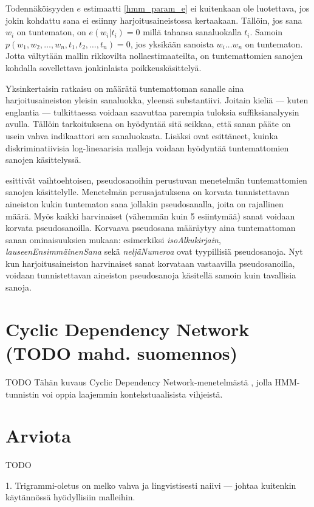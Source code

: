 \documentclass[utf8,bachelor,manualbib]{gradu3}
\begin{document}
Todennäköisyyden $e$ estimaatti \eqref{hmm_param_e} ei kuitenkaan ole luotettava, jos jokin kohdattu sana ei esiinny harjoitusaineistossa kertaakaan. Tällöin, jos sana $w_i$ on tuntematon, on $e(w_i|t_i)=0$ millä tahansa sanaluokalla $t_i$. Samoin $p(w_1, w_2, \ldots, w_n, t_1, t_2, \ldots, t_n) = 0$, jos yksikään sanoista $w_i \ldots w_n$ on tuntematon. Jotta vältytään mallin rikkovilta nollaestimaateilta, on tuntemattomien sanojen kohdalla sovellettava jonkinlaista poikkeuskäsittelyä.

Yksinkertaisin ratkaisu on määrätä tuntemattoman sanalle aina harjoitusaineiston yleisin sanaluokka, yleensä substantiivi. Joitain kieliä --- kuten englantia --- tulkittaessa voidaan saavuttaa parempia tuloksia suffiksianalyysin \citep{samuelsson1993} avulla. Tällöin tarkoituksena on hyödyntää sitä seikkaa, että sanan pääte on usein vahva indikaattori sen sanaluokasta. Lisäksi \citet{toutanova2003} ovat esittäneet, kuinka diskriminatiivisia log-lineaarisia malleja voidaan hyödyntää tuntemattomien sanojen käsittelyssä.

\citet{bikel1999} esittivät vaihtoehtoisen, pseudosanoihin perustuvan menetelmän tuntemattomien sanojen käsittelylle. Menetelmän perusajatuksena on korvata tunnistettavan aineiston kukin tuntematon sana jollakin pseudosanalla, joita on rajallinen määrä. Myös kaikki harvinaiset (vähemmän kuin 5 esiintymää) sanat voidaan korvata pseudosanoilla. Korvaava pseudosana määräytyy aina tuntemattoman sanan ominaisuuksien mukaan: esimerkiksi \textit{isoAlkukirjain}, \textit{lauseenEnsimmäinenSana} sekä \textit{neljäNumeroa} ovat tyypillisiä pseudosanoja. Nyt kun harjoitusaineiston harvinaiset sanat korvataan vastaavilla pseudosanoilla, voidaan tunnistettavan aineiston pseudosanoja käsitellä samoin kuin tavallisia sanoja.


\section{Cyclic Dependency Network (TODO mahd. suomennos)}

TODO Tähän kuvaus Cyclic Dependency Network-menetelmästä \citep{heckerman2000, toutanova2003}, jolla HMM-tunnistin voi oppia laajemmin kontekstuaalisista vihjeistä.

\section{Arviota}

TODO

1. Trigrammi-oletus on melko vahva ja lingvistisesti naiivi --- johtaa kuitenkin käytännössä hyödyllisiin malleihin.
\end{document}
